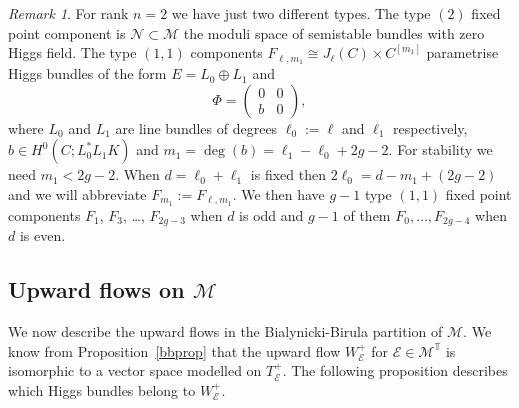 \documentclass[12pt]{article}
\numberwithin{equation}{section}
\theoremstyle{remark}
\newtheorem{remark}[theorem]{Remark}
\theoremstyle{definition}
\numberwithin{theorem}{section}
\def\calE{{\mathcal E}}
\def\calN{{\mathcal{N}}}
\def\M{{\mathcal{M}}}
\newcommand{\T}{{\mathbb{T}}}
\renewcommand{\1}{\mathbbm{1}}
\begin{document}
\begin{remark} \label{remarkn2} For rank $n=2$ we have just two different types. The type $(2)$ fixed point component is $\calN\subset \M$ the moduli space of semistable bundles with zero Higgs field. The type $(1,1)$ components $F_{\ell,m_1}\cong J_\ell(C)\times C^{[m_1]}$ parametrise Higgs bundles of the form $E=L_0\oplus L_1$ and $$\Phi=\left(\begin{array}{cc}0&0\\b&0\end{array} \right),$$ where $L_0$ and $L_1$ are line bundles of degrees $\ell_0:=\ell$ and $\ell_1$ respectively, $b\in H^0(C;L_0^*L_1K)$ and $m_1=\deg(b)=\ell_1-\ell_0+2g-2$. For stability we need $m_1<2g-2$. When $d=\ell_0+\ell_1$ is fixed then $2\ell_0=d-m_1+(2g-2)$ and we will abbreviate  $F_{m_1}:=F_{\ell,m_1}$. We then have $g-1$ type $(1,1)$ fixed point components $F_{1}$, $F_3$, \dots, $F_{2g-3}$ when $d$ is odd and $g-1$ of them $F_0,\dots, F_{2g-4}$ when $d$ is even.  
\end{remark}
\subsection{Upward flows on $\M$}

We  now describe the upward flows in the Bialynicki-Birula partition of $\M$. We know from Proposition~\ref{bbprop} that the upward flow $W^+_\calE$ for $\calE\in \M^\T$ is isomorphic to a vector space modelled on $T_\calE^+$. The following proposition describes which Higgs bundles belong to $W^+_\calE$. 
\end{document}
